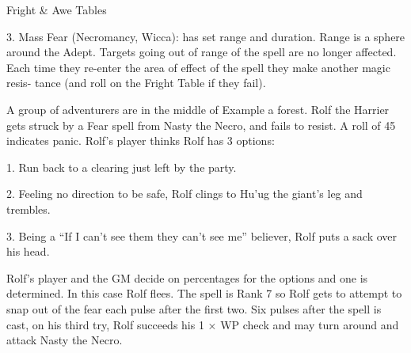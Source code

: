 \begin{Tables}{Fright \& Awe Tables}
\begin{multicols}{3}
3.  Mass  Fear  (Necromancy,  Wicca):  has  set  range 
and duration. Range is a sphere around the Adept. 
Targets  going  out  of  range  of  the  spell  are  no 
longer affected. Each time they re-enter the area of 
effect  of  the  spell  they  make  another  magic  resis-
tance (and roll on the Fright Table if they fail). 

A group of adventurers are in the middle of 
Example 
a  forest. Rolf the  Harrier  gets struck by a  Fear spell  from 
Nasty the Necro, and  fails to  resist.  A roll of 45  indicates 
panic. Rolf’s player thinks Rolf has 3 options: 

1. Run back to a clearing just left by the party. 

2. Feeling no direction to be safe, Rolf clings to Hu’ug the 
giant’s leg and trembles. 

3. Being a “If I can’t see them they can’t see me” believer, 
Rolf puts a sack over his head. 

Rolf’s  player  and  the  GM  decide  on  percentages  for  the 
options and one is determined. In this case Rolf flees. The 
spell  is  Rank  7  so  Rolf  gets  to  attempt  to  snap  out  of  the 
fear each pulse after the first two. Six pulses after the spell 
is  cast,  on  his  third  try,  Rolf  succeeds  his  1  ×  WP  check 
and may turn around and attack Nasty the Necro. 

\end{multicols}

\end{Tables}
